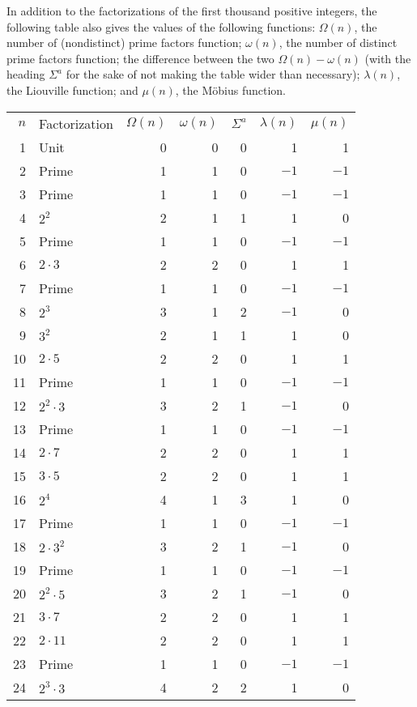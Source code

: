 \documentclass[12pt]{article}
\begin{document}
In addition to the factorizations of the first thousand positive integers, the following table also gives the values of the following functions: $\Omega(n)$, the number of (nondistinct) prime factors function; $\omega(n)$, the number of distinct prime factors function; the difference between the two $\Omega(n) - \omega(n)$ (with the heading $\Sigma^a$ for the sake of not making the table wider than necessary); $\lambda(n)$, the Liouville function; and $\mu(n)$, the M\"obius function.

\begin{tabular}{|r|l|r|r|r|r|r|}
$n$ & Factorization & $\Omega(n)$ & $\omega(n)$ & $\Sigma^a$ & $\lambda(n)$ & $\mu(n)$ \\
1 & Unit & 0 & 0 & 0 & 1 & 1 \\
2 & Prime & 1 & 1 & 0 & $-1$ & $-1$ \\
3 & Prime & 1 & 1 & 0 & $-1$ & $-1$ \\
4 & $2^2$ & 2 & 1 & 1 & 1 & 0 \\
5 & Prime & 1 & 1 & 0 & $-1$ & $-1$ \\
6 & $2 \cdot 3$ & 2 & 2 & 0 & 1 & 1 \\
7 & Prime & 1 & 1 & 0 & $-1$ & $-1$ \\
8 & $2^3$ & 3 & 1 & 2 & $-1$ & 0 \\
9 & $3^2$ & 2 & 1 & 1 & 1 & 0 \\
10 & $2 \cdot 5$ & 2 & 2 & 0 & 1 & 1 \\
11 & Prime & 1 & 1 & 0 & $-1$ & $-1$ \\
12 & $2^2 \cdot 3$ & 3 & 2 & 1 & $-1$ & 0 \\
13 & Prime & 1 & 1 & 0 & $-1$ & $-1$ \\
14 & $2 \cdot 7$ & 2 & 2 & 0 & 1 & 1 \\
15 & $3 \cdot 5$ & 2 & 2 & 0 & 1 & 1 \\
16 & $2^4$ & 4 & 1 & 3 & 1 & 0 \\
17 & Prime & 1 & 1 & 0 & $-1$ & $-1$ \\
18 & $2 \cdot 3^2$ & 3 & 2 & 1 & $-1$ & 0 \\
19 & Prime & 1 & 1 & 0 & $-1$ & $-1$ \\
20 & $2^2 \cdot 5$ & 3 & 2 & 1 & $-1$ & 0 \\
21 & $3 \cdot 7$ & 2 & 2 & 0 & 1 & 1 \\
22 & $2 \cdot 11$ & 2 & 2 & 0 & 1 & 1 \\
23 & Prime & 1 & 1 & 0 & $-1$ & $-1$ \\
24 & $2^3 \cdot 3$ & 4 & 2 & 2 & 1 & 0 \\

\end{tabular}
\end{document}
